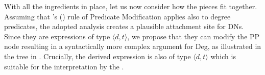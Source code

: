 \documentclass[output=paper,modfonts,hidelinks,newtxmath
\ChapterDOI{10.5281/zenodo.2545513}
]{langscibook}
\begin{document}
With all the ingredients in place, let us now consider how the pieces fit together. Assuming that \citeauthor{heim_kratzer1998semantics}'s (\citeyear{heim_kratzer1998semantics}) rule of Predicate Modification applies also to degree predicates, the adopted analysis creates a plausible attachment site for DNs. Since they are expressions of type $\langle d,t\rangle$, we propose that they can modify the PP node resulting in a syntactically more complex argument for Deg, as illustrated in the tree in . Crucially, the derived expression is also of type $\langle d,t\rangle$ which is suitable for the interpretation by the .



\begin{exe}
\ex\label{tree-comp-dvojnasobne}%
%
\end{exe}
\end{document}
